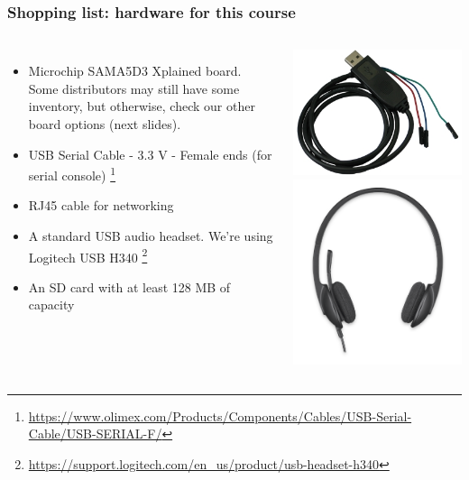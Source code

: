 \begin{frame}
\frametitle{Shopping list: hardware for this course}
  \begin{columns}
    \footnotesize
    \begin{itemize}
      \item Microchip SAMA5D3 Xplained board.\\
            Some distributors may still have some inventory, but otherwise,
            check our other board options (next slides).
      \item USB Serial Cable - 3.3 V - Female ends (for serial console)
            \footnote{\tiny \url{https://www.olimex.com/Products/Components/Cables/USB-Serial-Cable/USB-SERIAL-F/}}
      \item RJ45 cable for networking
      \item A standard USB audio headset. We're using Logitech USB H340
            \footnote{\tiny \url{https://support.logitech.com/en_us/product/usb-headset-h340}}
      \item An SD card with at least 128 MB of capacity
    \end{itemize}
    \includegraphics[height=0.20\textheight]{common/usb-serial-cable-female.png} \\
    \vspace{1cm}
    \includegraphics[height=0.15\textheight]{common/logitech-h340.png} \\

\end{columns}
\end{frame}
